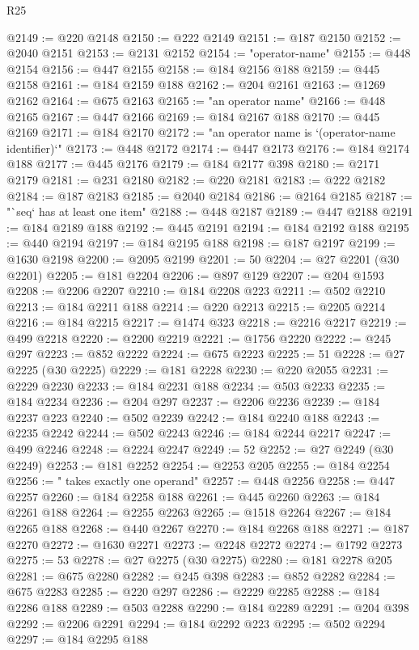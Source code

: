 \begin{lexlean}{R25}
\begin{coremodule}
@2149 := @220 @2148
@2150 := @222 @2149
@2151 := @187 @2150
@2152 := @2040 @2151
@2153 := @2131 @2152
@2154 := "operator-name"
@2155 := @448 @2154
@2156 := @447 @2155
@2158 := @184 @2156 @188
@2159 := @445 @2158
@2161 := @184 @2159 @188
@2162 := @204 @2161
@2163 := @1269 @2162
@2164 := @675 @2163
@2165 := "an operator name"
@2166 := @448 @2165
@2167 := @447 @2166
@2169 := @184 @2167 @188
@2170 := @445 @2169
@2171 := @184 @2170
@2172 := "an operator name is `(operator-name identifier)`"
@2173 := @448 @2172
@2174 := @447 @2173
@2176 := @184 @2174 @188
@2177 := @445 @2176
@2179 := @184 @2177 @398
@2180 := @2171 @2179
@2181 := @231 @2180
@2182 := @220 @2181
@2183 := @222 @2182
@2184 := @187 @2183
@2185 := @2040 @2184
@2186 := @2164 @2185
@2187 := "`seq` has at least one item"
@2188 := @448 @2187
@2189 := @447 @2188
@2191 := @184 @2189 @188
@2192 := @445 @2191
@2194 := @184 @2192 @188
@2195 := @440 @2194
@2197 := @184 @2195 @188
@2198 := @187 @2197
@2199 := @1630 @2198
@2200 := @2095 @2199
@2201 := 50
@2204 := @27 @2201 (@30 @2201)
@2205 := @181 @2204
@2206 := @897 @129
@2207 := @204 @1593
@2208 := @2206 @2207
@2210 := @184 @2208 @223
@2211 := @502 @2210
@2213 := @184 @2211 @188
@2214 := @220 @2213
@2215 := @2205 @2214
@2216 := @184 @2215
@2217 := @1474 @323
@2218 := @2216 @2217
@2219 := @499 @2218
@2220 := @2200 @2219
@2221 := @1756 @2220
@2222 := @245 @297
@2223 := @852 @2222
@2224 := @675 @2223
@2225 := 51
@2228 := @27 @2225 (@30 @2225)
@2229 := @181 @2228
@2230 := @220 @2055
@2231 := @2229 @2230
@2233 := @184 @2231 @188
@2234 := @503 @2233
@2235 := @184 @2234
@2236 := @204 @297
@2237 := @2206 @2236
@2239 := @184 @2237 @223
@2240 := @502 @2239
@2242 := @184 @2240 @188
@2243 := @2235 @2242
@2244 := @502 @2243
@2246 := @184 @2244 @2217
@2247 := @499 @2246
@2248 := @2224 @2247
@2249 := 52
@2252 := @27 @2249 (@30 @2249)
@2253 := @181 @2252
@2254 := @2253 @205
@2255 := @184 @2254
@2256 := " takes exactly one operand"
@2257 := @448 @2256
@2258 := @447 @2257
@2260 := @184 @2258 @188
@2261 := @445 @2260
@2263 := @184 @2261 @188
@2264 := @2255 @2263
@2265 := @1518 @2264
@2267 := @184 @2265 @188
@2268 := @440 @2267
@2270 := @184 @2268 @188
@2271 := @187 @2270
@2272 := @1630 @2271
@2273 := @2248 @2272
@2274 := @1792 @2273
@2275 := 53
@2278 := @27 @2275 (@30 @2275)
@2280 := @181 @2278 @205
@2281 := @675 @2280
@2282 := @245 @398
@2283 := @852 @2282
@2284 := @675 @2283
@2285 := @220 @297
@2286 := @2229 @2285
@2288 := @184 @2286 @188
@2289 := @503 @2288
@2290 := @184 @2289
@2291 := @204 @398
@2292 := @2206 @2291
@2294 := @184 @2292 @223
@2295 := @502 @2294
@2297 := @184 @2295 @188

\end{coremodule}
\end{lexlean}
